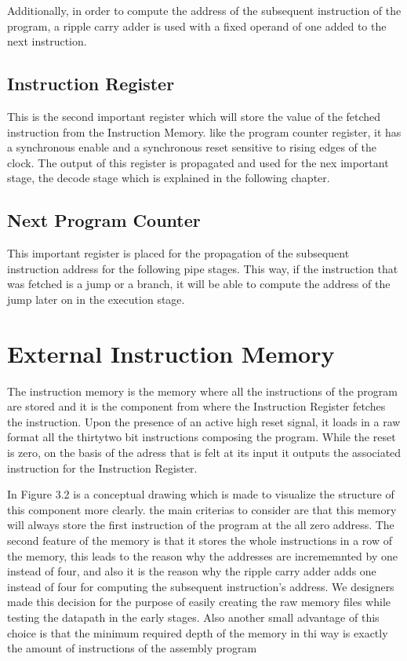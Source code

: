 Additionally, in order to compute the address of the subsequent instruction of the program, a ripple carry adder is used with a fixed operand of one added
to the next instruction.

\subsection{ Instruction Register }

This is the second important register which will store the value of the fetched instruction from the Instruction Memory. like the program counter register,
it has a synchronous enable and a synchronous reset sensitive to rising edges of the clock. The output of this register is propagated and used for the nex important stage,
the decode stage which is explained in the following chapter. 

\subsection{ Next Program Counter }

This important register is placed for the propagation of the subsequent instruction address for the following pipe stages. This way, if the instruction
that was fetched is a jump or a branch, it will be able to compute the address of the jump later on in the execution stage.

\section{External Instruction Memory}

The instruction memory is the memory where all the instructions of the program are stored and it is the component from where the Instruction Register fetches the 
instruction. Upon the presence of an active high reset signal, it loads in a raw format all the thirtytwo bit instructions composing the program. While the reset is zero,
on the basis of the adress that is felt at its input it outputs the associated instruction for the Instruction Register.

In Figure 3.2 is a conceptual drawing which is made to visualize the structure of this component more clearly. the main criterias to consider are that this
memory will always store the first instruction of the program at the all zero address. The second feature of the memory is that it stores the whole instructions
in a row of the memory, this leads to the reason why the addresses are incrememnted by one instead of four, and also it is the reason why the
ripple carry adder adds one instead of four for computing the subsequent instruction's address. We designers made this decision for the purpose of easily creating the
raw memory files while testing the datapath in the early stages. Also another small advantage of this choice is that the minimum required depth of the memory in thi way is exactly the amount
of instructions of the assembly program

